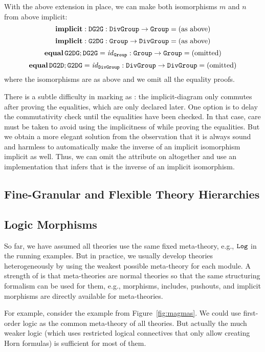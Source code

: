 \begin{example}[Isomorphisms]
With the above extension in place, we can make both isomorphisms $m$ and $n$ from above implicit:
\[\operatorname{\mathbf{implicit}}:\operatorname{\mathtt{DG2G}}:\operatorname{\mathtt{DivGroup}}\to\operatorname{\mathtt{Group}}=\text{(as above)}\]
\[\operatorname{\mathbf{implicit}}:\operatorname{\mathtt{G2DG}}:\operatorname{\mathtt{Group}}\to\operatorname{\mathtt{DivGroup}}=\text{(as above)}\]
\[\operatorname{\mathbf{equal}}\operatorname{\mathtt{G2DG}};\operatorname{\mathtt{DG2G}}=\mathit{id}_{\operatorname{\mathtt{Group}}}:\operatorname{\mathtt{Group}}\to\operatorname{\mathtt{Group}}=\text{(omitted)}\]
\[\operatorname{\mathbf{equal}}\operatorname{\mathtt{DG2D}};\operatorname{\mathtt{G2DG}}=\mathit{id}_{\operatorname{\mathtt{DivGroup}}}:\operatorname{\mathtt{DivGroup}}\to\operatorname{\mathtt{DivGroup}}=\text{(omitted)}\]
where the isomorphisms are as above and we omit all the equality proofs.

There is a subtle difficulty in marking  as : the implicit-diagram only commutes after proving the equalities, which are only declared later.
One option is to delay the commutativity check until the equalities have been checked.
In that case, care must be taken to avoid using the implicitness of  while proving the equalities.
But we obtain a more elegant solution from the observation that it is always sound and harmless to automatically make the inverse of an implicit isomorphism implicit as well.
Thus, we can omit the attribute  on  altogether and use an implementation that infers that  is the inverse of an implicit isomorphism.
\end{example}

\subsection{Fine-Granular and Flexible Theory Hierarchies}\label{sec:granular}


\subsection{Logic Morphisms}

So far, we have assumed all theories use the same fixed meta-theory, e.g., $\operatorname{\mathtt{Log}}$ in the running examples.
But in practice, we usually develop theories heterogeneously by using the weakest possible meta-theory for each module.
A strength of \mmt is that meta-theories are normal theories so that the same structuring formalism can be used for them, e.g., morphisms, includes, pushouts, and implicit morphisms are directly available for meta-theories.

For example, consider the example from Figure~\ref{fig:magmas}.
We could use first-order logic  as the common meta-theory of all theories.
But actually the much weaker logic  (which uses restricted logical connectives that only allow creating Horn formulas) is sufficient for most of them.

